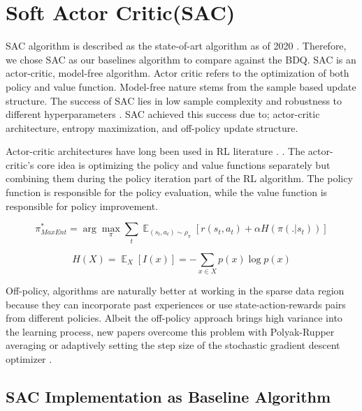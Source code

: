 \section{Soft Actor Critic(SAC)}


SAC algorithm is described as the state-of-art algorithm as of 2020 \cite{stable-baselines}. Therefore, we chose SAC as our baselines algorithm to compare against the BDQ. SAC is an actor-critic, model-free algorithm. Actor critic refers to the optimization of both policy and value function. Model-free nature stems from the sample based update structure. The success of SAC lies in low sample complexity and robustness to different hyperparameters \cite{Haarnoja2018}. SAC achieved this success due to; actor-critic architecture, entropy maximization, and off-policy update structure.


Actor-critic architectures have long been used in RL literature \cite{Konda2000}. \cite{Haarnoja2018}. The actor-critic's core idea is optimizing the policy and value functions separately but combining them during the policy iteration part of the RL algorithm. The policy function is responsible for the policy evaluation, while the value function is responsible for policy improvement.


\begin{equation}
    \pi^*_{MaxEnt} = \arg\max_{\pi}\sum_t\mathop{\mathbb{E}}_{(s_t,a_t)\sim \rho_{\pi}}[r(s_t, a_t) + \alpha H(\pi(.|s_t))]
    \label{eq:maxentRL}
\end{equation}

\begin{equation}
    H(X) = \mathop{\mathbb{E}}_X [I(x)] = -\sum\limits_{x \in X} p(x)\log p(x)
\end{equation}

Off-policy, algorithms are naturally better at working in the sparse data region because they can incorporate past experiences or use state-action-rewards pairs from different policies.  Albeit the off-policy approach brings high variance into the learning process, new papers overcome this problem with Polyak-Rupper averaging or adaptively setting the step size of the stochastic gradient descent optimizer \cite{Sutton2018}.

\subsection{SAC Implementation as Baseline Algorithm}

